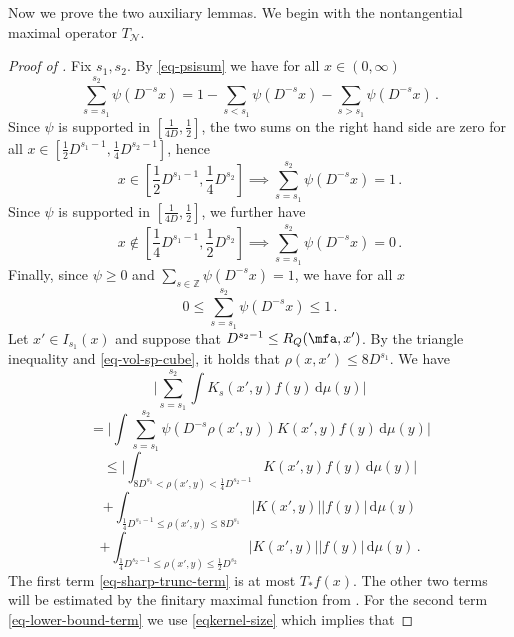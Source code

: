 Now we prove the two auxiliary lemmas. We begin with the nontangential maximal operator $T_{\mathcal{N}}$.

\begin{proof}[Proof of ]
    \leanok
    Fix $s_1, s_2$. By \eqref{eq-psisum} we have for all $x \in (0, \infty)$
    $$
        \sum_{s = s_1}^{s_2} \psi(D^{-s}x) = 1 - \sum_{s < s_1} \psi(D^{-s}x) - \sum_{s > s_1} \psi(D^{-s}x)\,.
    $$
    Since $\psi$ is supported in $[\frac{1}{4D}, \frac{1}{2}]$, the two sums on the right hand side are zero for all $x \in [\frac{1}{2}D^{s_1-1}, \frac{1}{4} D^{s_2 - 1}]$, hence
    $$
        x \in [\frac{1}{2}D^{s_1-1}, \frac{1}{4} D^{s_2}] \implies \sum_{s = s_1}^{s_2} \psi(D^{-s}x) = 1\,.
    $$
    Since $\psi$ is supported in $[\frac{1}{4D}, \frac{1}{2}]$, we further have
    $$
        x \notin [\frac{1}{4}D^{s_1 - 1}, \frac{1}{2}D^{s_2}] \implies \sum_{s = s_1}^{s_2} \psi(D^{-s}x) = 0\,.
    $$
    Finally, since $\psi \ge 0$ and $\sum_{s \in \mathbb{Z}} \psi(D^{-s}x) = 1$, we have for all $x$
    $$
        0 \le \sum_{s = s_1}^{s_2} \psi(D^{-s}x) \le 1\,.
    $$
    Let $x' \in I_{s_1}(x)$ and suppose that $D^{s_2 - 1} \le R_Q(\mfa, x')$. By the triangle inequality and \eqref{eq-vol-sp-cube}, it holds that $\rho(x,x') \le 8D^{s_1}$. We have
    $$
        \Bigg|\sum_{s = s_1}^{s_2} \int K_s(x',y) f(y) \, \mathrm{d}\mu(y)\Bigg|
    $$
    $$
        = \Bigg|\int \sum_{s = s_1}^{s_2} \psi(D^{-s}\rho(x',y)) K(x',y) f(y) \, \mathrm{d}\mu(y)\Bigg|
    $$
    \begin{equation}
        \label{eq-sharp-trunc-term}
        \le \Bigg| \int_{8D^{s_1} < \rho(x',y) < \frac{1}{4}D^{s_2-1}} K(x',y) f(y) \, \mathrm{d}\mu(y) \Bigg|
    \end{equation}
    \begin{equation}
        \label{eq-lower-bound-term}
        + \int_{\frac{1}{4}D^{s_1-1} \le \rho(x',y) \le 8D^{s_1}} |K(x', y)| |f(y)| \, \mathrm{d}\mu(y)
    \end{equation}
    \begin{equation}
        \label{eq-upper-bound-term}
        + \int_{\frac{1}{4}D^{s_2-1} \le \rho(x',y) \le \frac{1}{2}D^{s_2}} |K(x', y)| |f(y)| \, \mathrm{d}\mu(y)\,.
    \end{equation}
    The first term \eqref{eq-sharp-trunc-term} is at most $T_*f(x)$. The other two terms will be
    estimated by the finitary maximal function from .
    For the second term \eqref{eq-lower-bound-term} we use \eqref{eqkernel-size} which implies that

\end{proof}
